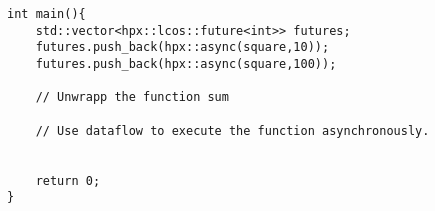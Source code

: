 \documentclass[11pt]{article}
\begin{document}
\begin{enumerate}
\begin{itemize}
\begin{lstlisting}
int main(){
	std::vector<hpx::lcos::future<int>> futures;
	futures.push_back(hpx::async(square,10));
	futures.push_back(hpx::async(square,100));
	
	// Unwrapp the function sum
	
	// Use dataflow to execute the function asynchronously.
	
		
	return 0;
}
\end{lstlisting} 
\end{itemize}


\end{enumerate}
\doclicenseThis 
\end{document}
